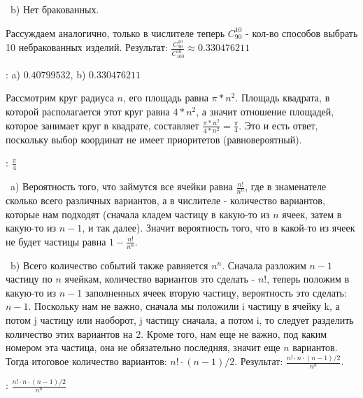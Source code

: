 \medskip
\noindent~b) Нет бракованных.

\noindent Рассуждаем аналогично, только в числителе теперь $C_{90}^{10}$ - кол-во способов выбрать
10 небракованных изделий. Результат: $\frac{C_{90}^{10}}{C_{100}^{10}} \approx 0.330476211$

\bigskip
{}: a) $0.40799532$, b) $0.330476211$



\noindent Рассмотрим круг радиуса $n$, его площадь равна $\pi * n^2$. Площадь квадрата, в которой 
располагается этот круг равна $4 * n^2$, а значит отношение площадей, которое занимает круг в 
квадрате, составляет $\frac{\pi * n^2}{4 * n^2} = \frac{\pi}{4}$. Это и есть ответ, поскольку
выбор координат не имеет приоритетов (равновероятный).

\bigskip
{}: $\frac{\pi}{4}$



\noindent~a) Вероятность того, что займутся все ячейки равна $\frac{n!}{n^n}$, где в знаменателе 
сколько всего различных вариантов, а в числителе - количество вариантов, которые нам подходят (сначала
кладем частицу в какую-то из $n$ ячеек, затем в какую-то из $n - 1$, и так далее). Значит вероятность
того, что в какой-то из ячеек не будет частицы равна $1 - \frac{n!}{n^n}$.

\medskip
\noindent~b) Всего количество событий также равняется $n^n$. Сначала разложим $n - 1$ частицу 
по $n$ ячейкам, количество вариантов это сделать - $n!$, теперь положим в какую-то из $n - 1$ 
заполненных ячеек вторую частицу, вероятность это сделать: $n - 1$. Поскольку нам не важно, сначала
мы положили i частицу в ячейку k, а потом j частицу или наоборот, j частицу сначала, а потом i, 
то следует разделить количество этих вариантов на 2. Кроме того, нам 
еще не важно, под каким номером эта частица, она не обязательно последняя, 
значит еще $n$ вариантов. Тогда итоговое количество вариантов:
$n! \cdot (n - 1) / 2$. Результат: $\frac{n! \cdot n \cdot (n - 1) / 2}{n^n}$.

\bigskip
{}: $\frac{n! \cdot n \cdot (n - 1) / 2}{n^n}$



